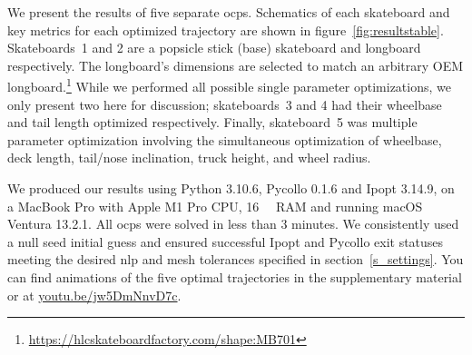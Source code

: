 \documentclass[default,iicol]{sn-jnl}
\begin{document}
We present the results of five separate \glspl{ocp}. Schematics of each skateboard and key metrics for each optimized trajectory are shown in figure~\ref{fig:resultstable}. Skateboards~1 and 2 are a popsicle stick (base) skateboard and longboard respectively. The longboard's dimensions are selected to match an arbitrary OEM longboard.\footnote{\url{https://hlcskateboardfactory.com/shape:MB701}} While we performed all possible single parameter optimizations, we only present two here for discussion; skateboards~3 and 4 had their wheelbase and tail length optimized respectively. Finally, skateboard~5 was multiple parameter optimization involving the simultaneous optimization of wheelbase, deck length, tail/nose inclination, truck height, and wheel radius.

We produced our results using Python 3.10.6, Pycollo 0.1.6 and Ipopt 3.14.9, on a MacBook Pro with Apple M1 Pro CPU, \SI{16}{\giga\byte} RAM and running macOS Ventura 13.2.1.
All \glspl{ocp} were solved in less than 3 minutes.
We consistently used a null seed initial guess and ensured successful Ipopt and Pycollo exit statuses meeting the desired \gls{nlp} and mesh tolerances specified in section~\ref{s_settings}.
You can find animations of the five optimal trajectories in the supplementary material or at \url{youtu.be/jw5DmNnvD7c}.
\end{document}
